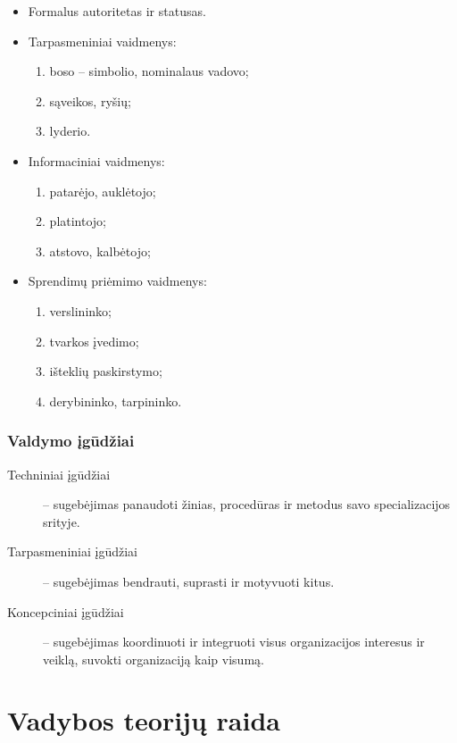 \begin{itemize}
  \item Formalus autoritetas ir statusas.
  \item Tarpasmeniniai vaidmenys:
    \begin{enumerate}
      \item boso – simbolio, nominalaus vadovo;
      \item sąveikos, ryšių;
      \item lyderio.
    \end{enumerate}
  \item Informaciniai vaidmenys:
    \begin{enumerate}
      \item patarėjo, auklėtojo;
      \item platintojo;
      \item atstovo, kalbėtojo;
    \end{enumerate}
  \item Sprendimų priėmimo vaidmenys:
    \begin{enumerate}
      \item verslininko;
      \item tvarkos įvedimo;
      \item išteklių paskirstymo;
      \item derybininko, tarpininko.
    \end{enumerate}
\end{itemize}

\subsection{Valdymo įgūdžiai}

\begin{description}
  \item[Techniniai įgūdžiai] – sugebėjimas panaudoti žinias, procedūras
    ir metodus savo specializacijos srityje.
  \item[Tarpasmeniniai įgūdžiai] – sugebėjimas bendrauti, suprasti
    ir motyvuoti kitus.
  \item[Koncepciniai įgūdžiai] – sugebėjimas koordinuoti ir integruoti
    visus organizacijos interesus ir veiklą, suvokti organizaciją
    kaip visumą.
\end{description}

\chapter{Vadybos teorijų raida}

